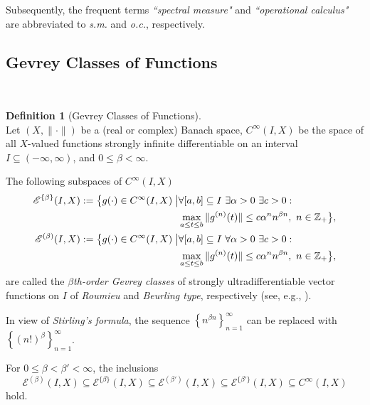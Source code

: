 \documentclass{amsart}
\theoremstyle{plain}
\theoremstyle{definition}
\newtheorem{defn}{Definition}[section]
\begin{document}
Subsequently, the frequent terms {\it ``spectral measure"} and {\it ``operational calculus"} are abbreviated to {\it s.m.} and {\it o.c.}, respectively.

\subsection{Gevrey Classes of Functions}\label{GCF}\

\begin{defn}[Gevrey Classes of Functions]\ \\
Let $(X,\|\cdot\|)$ be a (real or complex) Banach space, $C^\infty(I,X)$ be the space of all $X$-valued functions strongly infinite differentiable on an interval $I\subseteq (-\infty,\infty)$, and $0\le \beta<\infty$.

The following subspaces of $C^\infty(I,X)$
\begin{align*}
{\mathscr E}^{\{\beta\}}(I,X):=\bigl\{g(\cdot)\in C^{\infty}(I, X) \bigm |&
\forall [a,b] \subseteq I\ \exists \alpha>0\ \exists c>0:
\\
&\max_{a \le t \le b}\|g^{(n)}(t)\| \le c\alpha^n n^{\beta n},
\ n\in{{\mathbb Z}}_+\bigr\},\\
{\mathscr E}^{(\beta)}(I,X):= \bigl\{g(\cdot) \in C^{\infty}(I,X) \bigm |& 
\forall [a,b] \subseteq I\ \forall \alpha > 0 \ \exists c>0:
\\
&\max_{a \le t \le b}\|g^{(n)}(t)\| \le c\alpha^n n^{\beta n},
\ n\in{{\mathbb Z}}_+\bigr\},
\end{align*}
are called the {\it $\beta$th-order Gevrey classes} of strongly ultradifferentiable vector functions on $I$ of {\it Roumieu} and {\it Beurling type}, respectively (see, e.g., \cite{Gevrey,Komatsu1,Komatsu2,Komatsu3}).
\end{defn}

In view of {\it Stirling's formula}, the 
sequence $\left\{ n^{\beta n}\right\}_{n=1}^\infty$ can be replaced with
$\left\{ (n!)^\beta\right\}_{n=1}^\infty$.

For $0\le\beta<\beta'<\infty$, the inclusions
\begin{equation*}
{\mathscr E}^{(\beta)}(I,X)\subseteq{\mathscr E}^{\{\beta\}}(I,X)
\subseteq {\mathscr E}^{(\beta')}(I,X)\subseteq
{\mathscr E}^{\{\beta'\}}(I,X)\subseteq C^{\infty}(I,X)
\end{equation*}
hold.
\end{document}
